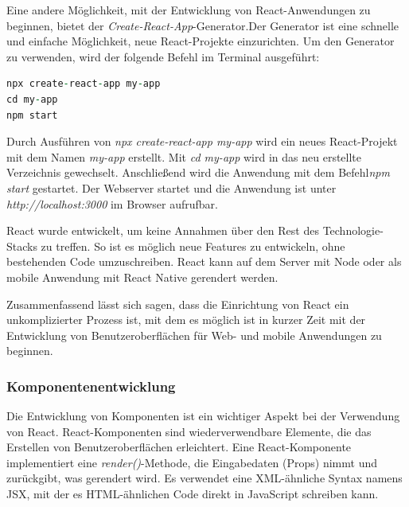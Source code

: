  Eine andere Möglichkeit, mit der Entwicklung von React-Anwendungen zu beginnen, bietet der \emph{Create-React-App}-Generator\cite{vsCodeReactTutorial}.Der Generator ist eine schnelle und einfache Möglichkeit, neue React-Projekte einzurichten. Um den Generator zu verwenden, wird der folgende Befehl im Terminal ausgeführt:
 
\begin{lstlisting}[language=vhdl,
	frame=single,           % Ein Rahmen um den Code
	framexleftmargin=15pt,  % Rahmen link von den Zahlen
	style=algoBericht,
	label={App-Erstellung},
	captionpos=b ,          % Caption unter den Code setzen
	caption={Beispiel Anwendungserstellung}]
npx create-react-app my-app
cd my-app
npm start
\end{lstlisting}
Durch Ausführen von \emph{npx create-react-app my-app} wird ein neues React-Projekt mit dem Namen \emph{my-app} erstellt. Mit \emph{cd my-app} wird in das neu erstellte Verzeichnis gewechselt. Anschließend wird die Anwendung mit dem Befehl\emph{npm start} gestartet.
Der Webserver startet und die Anwendung ist unter \emph{http://localhost:3000} im Browser aufrufbar.

React wurde entwickelt, um keine Annahmen über den Rest des Technologie-Stacks zu treffen. So ist es möglich neue Features zu entwickeln, ohne bestehenden Code umzuschreiben\cite{deLegacyReactjsDocs}. React kann auf dem Server mit Node oder als mobile Anwendung mit React Native gerendert werden.

Zusammenfassend lässt sich sagen, dass die Einrichtung von React ein unkomplizierter Prozess ist, mit dem es möglich ist in kurzer Zeit mit der Entwicklung von Benutzeroberflächen für Web- und mobile Anwendungen zu beginnen.

\subsubsection{Komponentenentwicklung}
Die Entwicklung von Komponenten ist ein wichtiger Aspekt bei der Verwendung von React. React-Komponenten sind wiederverwendbare Elemente, die das Erstellen von Benutzeroberflächen erleichtert. Eine React-Komponente implementiert eine \emph{render()}-Methode, die Eingabedaten (Props) nimmt und zurückgibt, was gerendert wird. Es verwendet eine XML-ähnliche Syntax namens JSX, mit der es HTML-ähnlichen Code direkt in JavaScript schreiben kann. \cite{deLegacyReactjs}

